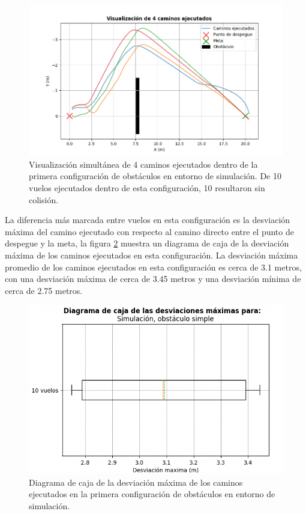 \begin{figure}[H]
    \centering
    \includegraphics[scale=0.65]{partes/img/sim-single-panel-graph-4.png}
    \caption[Visualización simultánea de 4 caminos ejecutados dentro de la primera configuración de obstáculos en entorno de simulación.]{Visualización simultánea de 4 caminos ejecutados dentro de la primera configuración de obstáculos en entorno de simulación. De 10 vuelos ejecutados dentro de esta configuración, 10 resultaron sin colisión.}
    \label{fig:single-graph-4}
\end{figure}

La diferencia más marcada entre vuelos en esta configuración es la desviación máxima del camino ejecutado con respecto al camino directo entre el punto de despegue y la meta, la figura \ref{fig:single-max-deviation} muestra un diagrama de caja de la desviación máxima de los caminos ejecutados en esta configuración. La desviación máxima promedio de los caminos ejecutados en esta configuración es cerca de 3.1 metros, con una desviación máxima de cerca de 3.45 metros y una desviación mínima de cerca de 2.75 metros.

\begin{figure}[H]
    \centering
    \includegraphics[scale=0.55]{partes/img/sim-single-panel-box.png}
    \caption[Diagrama de caja de la desviación máxima de los caminos ejecutados en la primera configuración de obstáculos en entorno de simulación.]{Diagrama de caja de la desviación máxima de los caminos ejecutados en la primera configuración de obstáculos en entorno de simulación.}
    \label{fig:single-max-deviation}
\end{figure}


